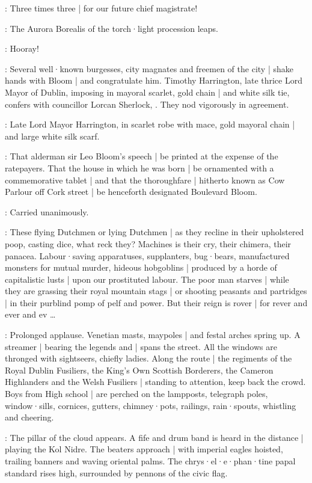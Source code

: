 \Elector:
Three times three |
for our future chief magistrate!

:
The Aurora Borealis of the torch·light procession leaps.

\Torchbearers:
Hooray!

:
Several well·known burgesses,
city magnates and freemen of the city |
shake hands with Bloom |
and congratulate him.
Timothy Harrington,
late thrice Lord Mayor of Dublin,
imposing in mayoral scarlet,
gold chain |
and white silk tie,
confers with councillor Lorcan Sherlock,
.
They nod vigorously in agreement.

:
Late Lord Mayor Harrington,
in scarlet robe with mace,
gold mayoral chain |
and large white silk scarf.

\Harrington:
That alderman sir Leo Bloom's speech |
be printed at the expense of the ratepayers.
That the house in which he was born |
be ornamented with a commemorative tablet |
and that the thoroughfare |
hitherto known as Cow Parlour off Cork street |
be henceforth designated Boulevard Bloom.

\Lorcan[2]:
Carried unanimously.

\Bloom:
These flying Dutchmen or lying Dutchmen |
as they recline in their upholstered poop,
casting dice,
what reck they?
Machines is their cry,
their chimera,
their panacea.
Labour·saving apparatuses,
supplanters,
bug·bears,
manufactured monsters for mutual murder,
hideous hobgoblins |
produced by a horde of capitalistic lusts |
upon our prostituted labour.
The poor man starves |
while they are grassing their royal mountain stags |
or shooting peasants and partridges |
in their purblind pomp of pelf and power.
But their reign is rover |
for rever and ever and ev \ldots

:
Prolonged applause.
Venetian masts,
maypoles |
and festal arches spring up.
A streamer |
bearing the legends 
and  |
spans the street.
All the windows are thronged with sightseers,
chiefly ladies.
Along the route |
the regiments of the Royal Dublin Fusiliers,
the King's Own Scottish Borderers,
the Cameron Highlanders
and the Welsh Fusiliers |
standing to attention,
keep back the crowd.
Boys from High school |
are perched on the lampposts,
telegraph poles,
window·sills,
cornices,
gutters,
chimney·pots,
railings,
rain·spouts,
whistling and cheering.

:
The pillar of the cloud appears.
A fife and drum band is heard in the distance |
playing the Kol Nidre.
The beaters approach |
with imperial eagles hoisted,
trailing banners and waving oriental palms.
The chrys·el·e·phan·tine papal standard rises high,
surrounded by pennons of the civic flag.

